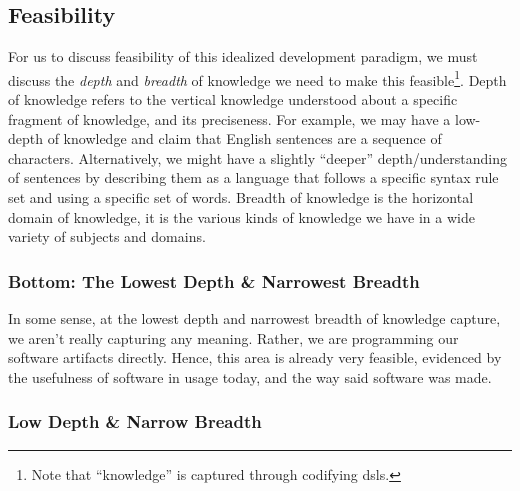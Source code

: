 \subsection{Feasibility}
\label{chap:ideology:sec:thoughts_of_generation:subsec:feasibility}

For us to discuss feasibility of this idealized development paradigm, we must
discuss the \textit{depth} and \textit{breadth} of knowledge we need to make
this feasible\footnote{Note that ``knowledge'' is captured through codifying
\acsp{dsl}.}. Depth of knowledge refers to the vertical knowledge understood
about a specific fragment of knowledge, and its preciseness. For example, we may
have a low-depth of knowledge and claim that English sentences are a sequence of
characters. Alternatively, we might have a slightly ``deeper''
depth/understanding  of sentences by describing them as a language that follows
a specific syntax rule set and using a specific set of words. Breadth of
knowledge is the horizontal domain of knowledge, it is the various kinds of
knowledge we have in a wide variety of subjects and domains.

\subsubsection{Bottom: The Lowest Depth \& Narrowest Breadth}
\label{chap:ideology:sec:thoughts_of_generation:subsec:feasibility:subsubsec:bottom}

In some sense, at the lowest depth and narrowest breadth of knowledge capture,
we aren't really capturing any meaning. Rather, we are programming our software
artifacts directly. Hence, this area is already very feasible, evidenced by the
usefulness of software in usage today, and the way said software was made.

\subsubsection{Low Depth \& Narrow Breadth}
\label{chap:ideology:sec:thoughts_of_generation:subsec:feasibility:subsubsec:low}

